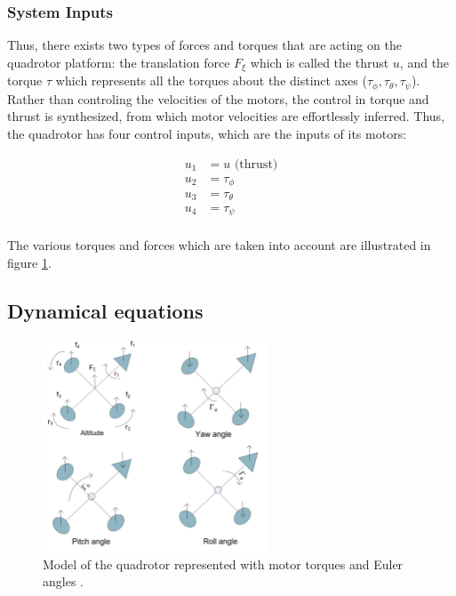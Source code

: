 \documentclass{thesisreport}
\begin{document}
\subsubsection*{System Inputs}

Thus, there exists two types of forces and torques that are acting on the quadrotor platform: the translation force $F_{\xi}$ which is called the thrust $u$, and the torque $\tau$ which represents all the torques about the distinct axes ($\tau_{\phi}, \tau_{\theta}, \tau_{\psi} $). \\

Rather than controling the velocities of the motors, the control in torque and thrust is synthesized, from which motor velocities are effortlessly inferred. Thus, the quadrotor has four control inputs, which are the inputs of its motors:

\begin{align*}
u_1 &= u \text{ (thrust)} \\
u_2 &= \tau_{\phi}\\
u_3 &= \tau_{\theta}\\
u_4 &= \tau_{\psi}\\
\end{align*}

The various torques and forces which are taken into account are illustrated in figure \ref{Fantoni_a}.

\subsection{Dynamical equations}

\begin{figure}[h]
\centering
\includegraphics[width=0.6\textwidth]{Images/Modeling/Fantoni_a}
\caption{Model of the quadrotor represented with motor torques and Euler angles \cite{Fantoni2016}.}
\label{Fantoni_a}
\end{figure}
\end{document}
